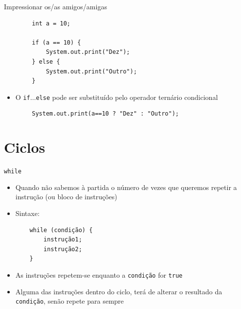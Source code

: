 \documentclass[portuguese, aspectratio=169, xcolor=table]{beamer}
\begin{document}
\begin{frame}[fragile]{Impressionar os/as amigos/amigas}



\begin{verbatim}
        int a = 10;
        
        if (a == 10) {
            System.out.print("Dez");
        } else {
            System.out.print("Outro");
        }
\end{verbatim}
\begin{itemize}
    \item O \texttt{if}$\ldots$\texttt{else} pode ser substituído pelo operador ternário condicional
\end{itemize}
\begin{verbatim}
        System.out.print(a==10 ? "Dez" : "Outro");
\end{verbatim}

\end{frame}

\section{Ciclos}

\begin{frame}[fragile]{\texttt{while}}
\begin{itemize}
    \item Quando não sabemos à partida o número de vezes que queremos repetir a instrução (ou bloco de instruções)
    \item Sintaxe:
    \begin{verbatim}
    while (condição) {
        instrução1;
        instrução2;
    }
    \end{verbatim}
    \item As instruções repetem-se enquanto a \texttt{condição} for \texttt{true}
    \item Alguma das instruções dentro do ciclo, terá de alterar o resultado da \texttt{condição}, senão repete para sempre
\end{itemize}
\end{frame}
\end{document}
